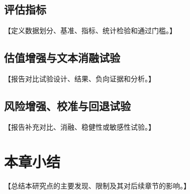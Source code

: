 \subsection{评估指标}

【定义数据划分、基准、指标、统计检验和通过门槛。】

\subsection{估值增强与文本消融试验}

【报告对比试验设计、结果、负向证据和分析。】

\subsection{风险增强、校准与回退试验}

【报告补充对比、消融、稳健性或敏感性试验。】

\section{本章小结}

【总结本研究点的主要发现、限制及其对后续章节的影响。】
